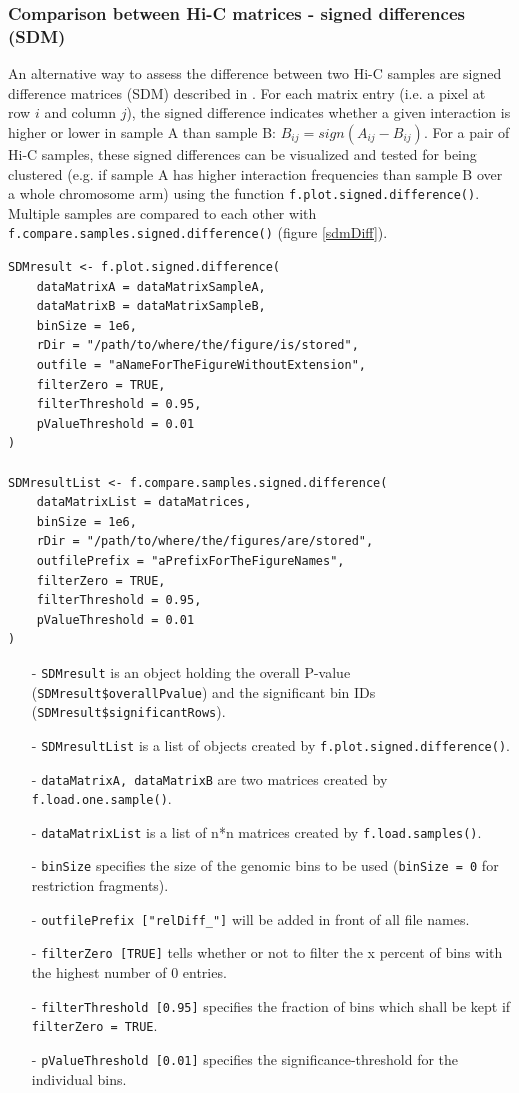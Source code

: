 \documentclass[a4paper,10pt]{article}
\begin{document}
\subsubsection{Comparison between Hi-C matrices - signed differences (SDM)}
An alternative way to assess the difference between two Hi-C samples are signed difference matrices (SDM) described in \cite{2014_Grob}. For each matrix entry (i.e. a pixel at row $i$ and column $j$), the signed difference indicates whether a given interaction is higher or lower in sample A than sample B: $B_{ij}=sign(A_{ij}-B_{ij})$. For a pair of Hi-C samples, these signed differences can be visualized and tested for being clustered (e.g. if sample A has higher interaction frequencies than sample B over a whole chromosome arm) using the function \texttt{f.plot.signed.difference()}. Multiple samples are compared to each other with \texttt{f.compare.samples.signed.difference()}  (figure \ref{sdmDiff}).
\begin{verbatim}
SDMresult <- f.plot.signed.difference(
    dataMatrixA = dataMatrixSampleA,
    dataMatrixB = dataMatrixSampleB,
    binSize = 1e6,
    rDir = "/path/to/where/the/figure/is/stored",
    outfile = "aNameForTheFigureWithoutExtension",
    filterZero = TRUE,
    filterThreshold = 0.95,
    pValueThreshold = 0.01
)

SDMresultList <- f.compare.samples.signed.difference(
    dataMatrixList = dataMatrices,
    binSize = 1e6,
    rDir = "/path/to/where/the/figures/are/stored",
    outfilePrefix = "aPrefixForTheFigureNames",
    filterZero = TRUE,
    filterThreshold = 0.95,
    pValueThreshold = 0.01
)
\end{verbatim}
\begin{itemize}
 \item[-] \texttt{SDMresult} is an object holding the overall P-value (\texttt{SDMresult\$overallPvalue}) and the significant bin IDs (\texttt{SDMresult\$significantRows}). 
 \item[-] \texttt{SDMresultList} is a list of objects created by \texttt{f.plot.signed.difference()}.
 \item[-] \texttt{dataMatrixA, dataMatrixB} are two matrices created by \texttt{f.load.one.sample()}.
 \item[-] \texttt{dataMatrixList} is a list of n*n matrices created by \texttt{f.load.samples()}. 
 \item[-] \texttt{binSize} specifies the size of the genomic bins to be used (\texttt{binSize = 0} for restriction fragments).
 \item[-] \texttt{outfilePrefix ["relDiff\_"]} will be added in front of all file names.
 \item[-] \texttt{filterZero [TRUE]} tells whether or not to filter the x percent of bins with the highest number of 0 entries.
 \item[-] \texttt{filterThreshold [0.95]} specifies the fraction of bins which shall be kept if \texttt{filterZero = TRUE}.
 \item[-] \texttt{pValueThreshold [0.01]} specifies the significance-threshold for the individual bins.
\end{itemize}
\end{document}
